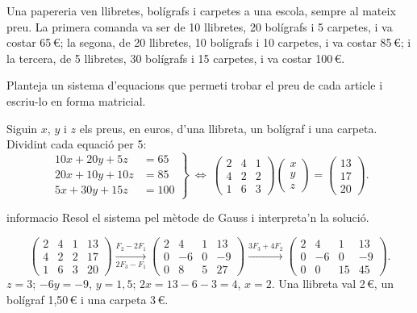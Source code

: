 Una papereria ven llibretes, bolígrafs i carpetes a una escola, sempre al mateix preu. La primera comanda
va ser de 10 llibretes, 20 bolígrafs i 5 carpetes, i va costar 65\,€; la segona, de 20 llibretes, 10
bolígrafs i 10 carpetes, i va costar 85\,€; i la tercera, de 5 llibretes, 30 bolígrafs i 15 carpetes, i
va costar 100\,€.

\begin{apartats}

Planteja un sistema d'equacions que permeti trobar el preu de cada article i escriu-lo en forma
matricial.

\begin{solucio}
Siguin $x$, $y$ i $z$ els preus, en euros, d'una llibreta, un bolígraf i una carpeta. Dividint cada
equació per 5:
\[
\left.\begin{aligned}10x+20y+5z&=65\\20x+10y+10z&=85\\5x+30y+15z&=100\end{aligned}\right\}
\ \Longleftrightarrow\
\begin{pmatrix}2&4&1\\4&2&2\\1&6&3\end{pmatrix}\begin{pmatrix}x\\y\\z\end{pmatrix}=\begin{pmatrix}13\\17\\20\end{pmatrix}.
\]
\end{solucio}

\begin{tria}{informacio}
Resol el sistema pel mètode de Gauss i interpreta'n la solució.

\begin{solucio}
\[
\left(\begin{array}{ccc|c}2&4&1&13\\4&2&2&17\\1&6&3&20\end{array}\right)
\xrightarrow[2F_3-F_1]{F_2-2F_1}
\left(\begin{array}{ccc|c}2&4&1&13\\0&-6&0&-9\\0&8&5&27\end{array}\right)
\xrightarrow{3F_3+4F_2}
\left(\begin{array}{ccc|c}2&4&1&13\\0&-6&0&-9\\0&0&15&45\end{array}\right).
\]
$z=3$; $-6y=-9$, $y=1{,}5$; $2x=13-6-3=4$, $x=2$. Una llibreta val 2\,€, un bolígraf 1,50\,€ i una
carpeta 3\,€.
\end{solucio}


\end{tria}
\end{apartats}
